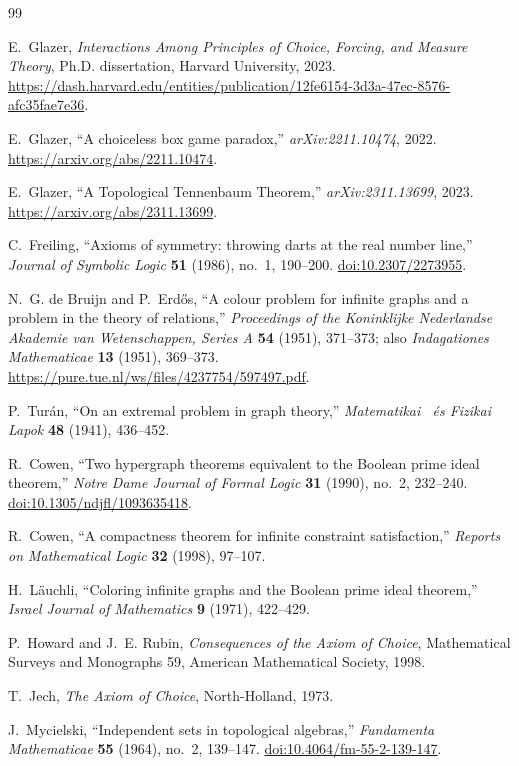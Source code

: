 \documentclass[11pt]{article}
\theoremstyle{definition}
\theoremstyle{remark}
\newcommand{\doi}[1]{\href{https://doi.org/#1}{doi:#1}}
\begin{document}
\begin{thebibliography}{99}

E.~Glazer,
\emph{Interactions Among Principles of Choice, Forcing, and Measure Theory},
Ph.D. dissertation, Harvard University, 2023.
\url{https://dash.harvard.edu/entities/publication/12fe6154-3d3a-47ec-8576-afc35fae7e36}.

E.~Glazer,
``A choiceless box game paradox,''
\emph{arXiv:2211.10474}, 2022.
\url{https://arxiv.org/abs/2211.10474}.

E.~Glazer,
``A Topological Tennenbaum Theorem,''
\emph{arXiv:2311.13699}, 2023.
\url{https://arxiv.org/abs/2311.13699}.

C.~Freiling,
``Axioms of symmetry: throwing darts at the real number line,''
\emph{Journal of Symbolic Logic} \textbf{51} (1986), no.~1, 190--200.
\doi{10.2307/2273955}.

N.~G. de Bruijn and P.~Erd\H{o}s,
``A colour problem for infinite graphs and a problem in the theory of
relations,''
\emph{Proceedings of the Koninklijke Nederlandse Akademie van Wetenschappen,
Series A} \textbf{54} (1951), 371--373; also
\emph{Indagationes Mathematicae} \textbf{13} (1951), 369--373.
\url{https://pure.tue.nl/ws/files/4237754/597497.pdf}.

P.~Tur\'an,
``On an extremal problem in graph theory,''
\emph{Matematikai \ és Fizikai Lapok} \textbf{48} (1941), 436--452.

R.~Cowen,
``Two hypergraph theorems equivalent to the Boolean prime ideal theorem,''
\emph{Notre Dame Journal of Formal Logic} \textbf{31} (1990), no.~2,
232--240.
\doi{10.1305/ndjfl/1093635418}.

R.~Cowen,
``A compactness theorem for infinite constraint satisfaction,''
\emph{Reports on Mathematical Logic} \textbf{32} (1998), 97--107.

H.~L\"auchli,
``Coloring infinite graphs and the Boolean prime ideal theorem,''
\emph{Israel Journal of Mathematics} \textbf{9} (1971), 422--429.

P.~Howard and J.~E. Rubin,
\emph{Consequences of the Axiom of Choice},
Mathematical Surveys and Monographs 59, American Mathematical Society, 1998.

T.~Jech,
\emph{The Axiom of Choice},
North-Holland, 1973.

J.~Mycielski,
``Independent sets in topological algebras,''
\emph{Fundamenta Mathematicae} \textbf{55} (1964), no.~2, 139--147.
\doi{10.4064/fm-55-2-139-147}.


\end{thebibliography}
\end{document}
